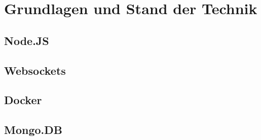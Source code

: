 
\chapter{Grundlagen und Stand der Technik}\label{cha:Grundlagen}
\section{Node.JS}\label{sec:Node.JS}

\section{Websockets}\label{sec:Websockets}

\section{Docker}\label{sec:Docker}

\section{Mongo.DB}\label{sec:Mongo.DB}